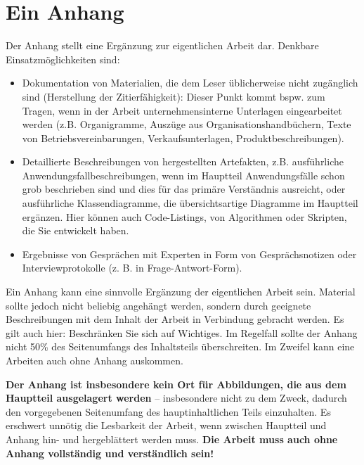 \chapter{Ein Anhang}
\label{chap:ein-anhang}


Der Anhang stellt eine Ergänzung zur eigentlichen Arbeit dar. Denkbare Einsatzmöglichkeiten sind:

\begin{itemize}
    \item Dokumentation von Materialien, die dem Leser üblicherweise nicht zugänglich sind (Herstellung der Zitierfähigkeit): Dieser Punkt kommt bspw. zum Tragen, wenn in der Arbeit unternehmensinterne Unterlagen eingearbeitet werden (z.B. Organigramme, Auszüge aus Organisationshandbüchern, Texte von Betriebsvereinbarungen, Verkaufsunterlagen, Produktbeschreibungen).
    \item Detaillierte Beschreibungen von hergestellten Artefakten, z.B. ausführliche Anwendungsfallbeschreibungen, wenn im Hauptteil Anwendungsfälle schon grob beschrieben sind und dies für das primäre Verständnis ausreicht, oder ausführliche Klassendiagramme, die übersichtsartige Diagramme im Hauptteil ergänzen. Hier können auch Code-Listings, von Algorithmen oder Skripten, die Sie entwickelt haben.
    \item Ergebnisse von Gesprächen mit Experten in Form von Gesprächsnotizen oder  Interviewprotokolle (z. B. in Frage-Antwort-Form).
\end{itemize}


Ein Anhang kann eine sinnvolle Ergänzung der eigentlichen Arbeit sein. Material sollte jedoch nicht beliebig angehängt werden, sondern durch geeignete Beschreibungen mit dem Inhalt der Arbeit in Verbindung gebracht werden. Es gilt auch hier: Beschränken Sie sich auf Wichtiges. Im Regelfall sollte der Anhang nicht 50\% des Seitenumfangs des Inhaltsteils überschreiten. Im Zweifel kann eine Arbeiten auch ohne Anhang auskommen.

\textbf{Der Anhang ist insbesondere kein Ort für Abbildungen, die aus dem Hauptteil ausgelagert werden} -- insbesondere nicht zu dem Zweck, dadurch den vorgegebenen Seitenumfang des hauptinhaltlichen Teils einzuhalten. Es erschwert unnötig die Lesbarkeit der Arbeit, wenn zwischen Hauptteil und Anhang hin- und hergeblättert werden muss. \textbf{Die Arbeit muss auch ohne Anhang vollständig und verständlich sein!}
